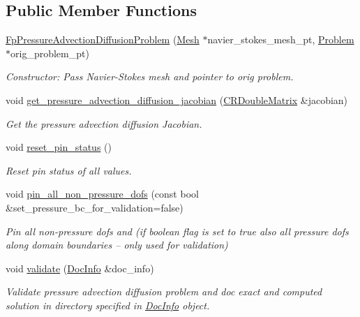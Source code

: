 \subsection*{Public Member Functions}
\begin{DoxyCompactItemize}
\item 
\hyperlink{classoomph_1_1FpPressureAdvectionDiffusionProblem_a6e592be14db55b57bf8045c5c7d1993b}{Fp\+Pressure\+Advection\+Diffusion\+Problem} (\hyperlink{classoomph_1_1Mesh}{Mesh} $\ast$navier\+\_\+stokes\+\_\+mesh\+\_\+pt, \hyperlink{classoomph_1_1Problem}{Problem} $\ast$orig\+\_\+problem\+\_\+pt)
\begin{DoxyCompactList}\small\item\em Constructor\+: Pass Navier-\/\+Stokes mesh and pointer to orig problem. \end{DoxyCompactList}\item 
void \hyperlink{classoomph_1_1FpPressureAdvectionDiffusionProblem_a54b59cff41c3b0cca9524e202bd49453}{get\+\_\+pressure\+\_\+advection\+\_\+diffusion\+\_\+jacobian} (\hyperlink{classoomph_1_1CRDoubleMatrix}{C\+R\+Double\+Matrix} \&jacobian)
\begin{DoxyCompactList}\small\item\em Get the pressure advection diffusion Jacobian. \end{DoxyCompactList}\item 
void \hyperlink{classoomph_1_1FpPressureAdvectionDiffusionProblem_ad7d514f813007a3b381a2eb7a930f19e}{reset\+\_\+pin\+\_\+status} ()
\begin{DoxyCompactList}\small\item\em Reset pin status of all values. \end{DoxyCompactList}\item 
void \hyperlink{classoomph_1_1FpPressureAdvectionDiffusionProblem_a7c1c429ed80863d9de3f3dd1bf8d1b3c}{pin\+\_\+all\+\_\+non\+\_\+pressure\+\_\+dofs} (const bool \&set\+\_\+pressure\+\_\+bc\+\_\+for\+\_\+validation=false)
\begin{DoxyCompactList}\small\item\em Pin all non-\/pressure dofs and (if boolean flag is set to true also all pressure dofs along domain boundaries -- only used for validation) \end{DoxyCompactList}\item 
void \hyperlink{classoomph_1_1FpPressureAdvectionDiffusionProblem_ae24eef02cff52b57dca6c1daf274bab2}{validate} (\hyperlink{classoomph_1_1DocInfo}{Doc\+Info} \&doc\+\_\+info)
\begin{DoxyCompactList}\small\item\em Validate pressure advection diffusion problem and doc exact and computed solution in directory specified in \hyperlink{classoomph_1_1DocInfo}{Doc\+Info} object. \end{DoxyCompactList}\item 

\end{DoxyCompactItemize}
